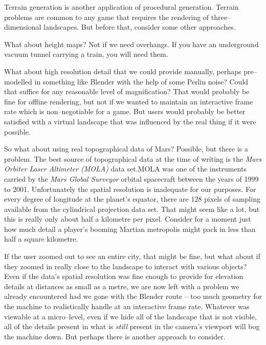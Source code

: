 Terrain generation is another application of procedural generation. Terrain problems are common to any game that requires the rendering of three--dimensional landscapes. But before that, consider some other approaches.

What about height maps? Not if we need overhangs. If you have an underground vacuum tunnel carrying a train, you will need them.

What about high resolution detail that we could provide manually, perhaps pre--modelled in something like Blender with the help of some Perlin noise? Could that suffice for any reasonable level of magnification? That would probably be fine for offline rendering, but not if we wanted to maintain an interactive frame rate which is non--negotiable for a game. But users would probably be better satisfied with a virtual landscape that was influenced by the real thing if it were possible.

So what about using real topographical data of Mars? Possible, but there is a problem. The best source of topographical data at the time of writing is the {\it Mars Orbiter Laser Altimeter (MOLA)} data set.\footnotecite[mola] MOLA was one of the instruments carried by the {\it Mars Global Surveyor} orbital spacecraft between the years of 1999 to 2001. Unfortunately the spatial resolution is inadequate for our purposes. For every degree of longitude at the planet's equator, there are 128 pixels of sampling available from the cylindrical projection data set. That might seem like a lot, but this is really only about half a kilometre per pixel. Consider for a moment just how much detail a player's booming Martian metropolis might pack in less than half a square kilometre.

If the user zoomed out to see an entire city, that might be fine, but what about if they zoomed in really close to the landscape to interact with various objects? Even if the data's spatial resolution was fine enough to provide for elevation details at distances as small as a metre, we are now left with a problem we already encountered had we gone with the Blender route -- too much geometry for the machine to realistically handle at an interactive frame rate. Whatever was viewable at a micro--level, even if we hide all of the landscape that is not visible, all of the details present in what is {\it still} present in the camera's viewport will bog the machine down. But perhaps there is another approach to consider.

